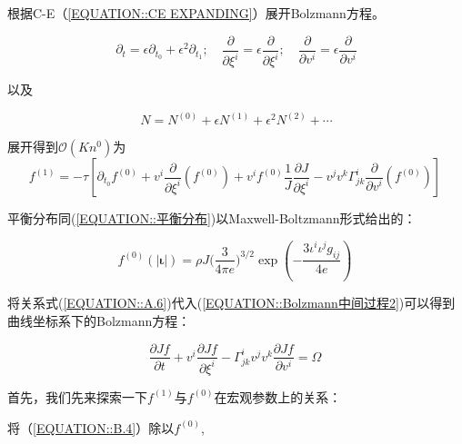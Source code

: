 \documentclass[MathematicsNumericsDerivationsAndOpenFOAM.tex]{subfiles}
\begin{document}
根据C-E（\ref{EQUATION::CE EXPANDING}）展开Bolzmann方程。

%
%
$$
  \partial_{t}=\epsilon \partial_{t_{0}}+\epsilon^{2} \partial_{t_{1}} ; \quad \frac{\partial}{\partial \xi^{i}}=\epsilon \frac{\partial}{\partial \xi^{i}} ; \quad \frac{\partial}{\partial v^{i}}=\epsilon \frac{\partial}{\partial v^{i}}
$$

以及

$$
  N=N^{(0)}+\epsilon N^{(1)}+\epsilon^{2} N^{(2)}+\cdots
$$
%

展开得到$\mathcal{O}\left(K n^{0}\right)$为
\begin{equation}
  f^{(1)}=-\tau\left[\partial_{t_{0}} f^{(0)}+v^{i} \frac{\partial}{\partial \xi^{i}}\left(f^{(0)}\right) + v^if^{(0)} \frac{1}{J} \frac{\partial J}{\partial \xi^i} -v^{j} v^{k}\Gamma_{j k}^{i}\frac{\partial}{\partial v^{i}}\left(  f^{(0)}\right)\right]
  \label{EQUATION::B.4} ~
\end{equation}
%



平衡分布同(\ref{EQUATION::平衡分布})以Maxwell-Boltzmann形式给出的：
%
%

\begin{equation}
  \boxed{
    f^{(0)}(| \boldsymbol{\iota}|) = \rho J {(\frac{3}{4\pi e}})^{3/2}\exp({-\frac{3 {\iota^i\iota^jg_{ij}}}{4e}})
  }
  \label{EQUATION::平衡分布2} ~
\end{equation}

将关系式(\ref{EQUATION::A.6})代入(\ref{EQUATION::Bolzmann中间过程2})可以得到曲线坐标系下的Bolzmann方程：

\begin{equation}
  \boxed{
  \frac{\partial Jf}{\partial t}+v^{i} \frac{\partial Jf}{\partial \xi^{i}}  - \Gamma_{j k}^{i} v^{j} v^{k}  \frac{\partial Jf}{\partial  v^{i}}  =\Omega
  }
  \label{EQUATION::Bolzamman 曲线} ~
\end{equation}




首先，我们先来探索一下$f^{(1)}$与$f^{(0)}$在宏观参数上的关系：

将（\ref{EQUATION::B.4}）除以$f^{(0)}$,
\end{document}
